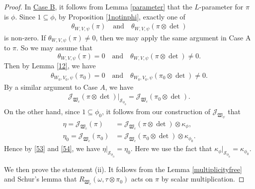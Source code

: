 \documentclass[article]{article}
\numberwithin{equation}{section}
\theoremstyle{definition}
\begin{document}
\begin{proof}
In \underline{Case B}, it follows from Lemma \ref{parameter} that the $L$-parameter for $\pi$ is $\phi$. Since $\mathrm 1 \subseteq \phi$, by Proposition \ref{1notinphi}, exactly one of 
\begin{align*}
\theta_{W,V,\psi}(\pi) \quad \mbox{and}\quad \theta_{W,V,\psi}(\pi\otimes\det)
\end{align*}
is non-zero. If $\theta_{W,V,\psi}(\pi)\neq 0$, then we may apply the same argument in Case A to $\pi$. So we may assume that $$\theta_{W,V,\psi}(\pi)= 0 \quad \mbox{and}\quad  \theta_{W,V,\psi}(\pi\otimes\det)\neq 0.$$ 
Then by Lemma \ref{12}, we have 
\begin{align*}
\theta_{W_0,V_0,\psi}(\pi_0)= 0 \quad \mbox{and}\quad  \theta_{W_0,V_0,\psi}(\pi_0\otimes\det)\neq 0.
\end{align*}
By a similar argument to Case $A$, we have 
\begin{align}\label{53}
\mathcal J_{\mathfrak W_{c}}(\pi\otimes\det)|_{\mathcal S_{\phi_0}}= \mathcal J_{\mathfrak W_{c}}(\pi_0\otimes\det).
\end{align}
On the other hand, since $1\subseteq \phi_0$, it follows from our construction of $\mathcal J_{\mathfrak W_{\psi}}$ that 
\begin{equation}
\begin{aligned}\label{54}
\eta=\mathcal J_{\mathfrak W_{c}}(\pi)&= \mathcal J_{\mathfrak W_{c}}(\pi\otimes\det)\otimes\kappa_{\phi},\\
\eta_0=\mathcal J_{\mathfrak W_{c}}(\pi_0)&= \mathcal J_{\mathfrak W_{c}}(\pi_0\otimes\det)\otimes\kappa_{\phi_0}.
\end{aligned}
\end{equation}
Hence by \ref{53} and \ref{54}, we have $\eta|_{\mathcal S_{\phi_0}}=\eta_{0}$. Here we use the fact that $\kappa_{\phi}|_{\mathcal S_{\phi_{0}}}=\kappa_{\phi_{0}}$. 

We then prove the statement (ii). It follows from the Lemma \ref{multiplicityfree} and Schur's lemma that  $R_{\mathfrak W_{c}}(\omega,\tau\otimes \pi_0)$ acts on $\pi$ by scalar multiplication. 


\end{proof}
\end{document}
